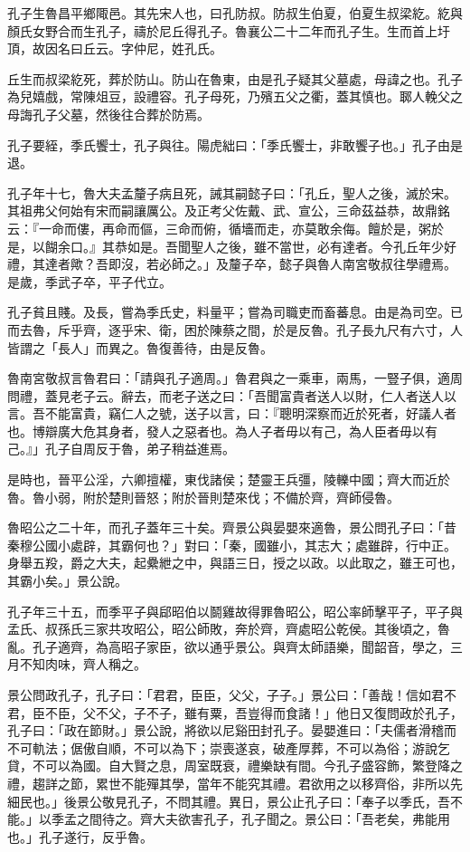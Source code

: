 
\begin{pinyinscope}
孔子生魯昌平鄉陬邑。其先宋人也，曰孔防叔。防叔生伯夏，伯夏生叔梁紇。紇與顏氏女野合而生孔子，禱於尼丘得孔子。魯襄公二十二年而孔子生。生而首上圩頂，故因名曰丘云。字仲尼，姓孔氏。

丘生而叔梁紇死，葬於防山。防山在魯東，由是孔子疑其父墓處，母諱之也。孔子為兒嬉戲，常陳俎豆，設禮容。孔子母死，乃殯五父之衢，蓋其慎也。郰人輓父之母誨孔子父墓，然後往合葬於防焉。

孔子要絰，季氏饗士，孔子與往。陽虎絀曰：「季氏饗士，非敢饗子也。」孔子由是退。

孔子年十七，魯大夫孟釐子病且死，誡其嗣懿子曰：「孔丘，聖人之後，滅於宋。其祖弗父何始有宋而嗣讓厲公。及正考父佐戴、武、宣公，三命茲益恭，故鼎銘云：『一命而僂，再命而傴，三命而俯，循墻而走，亦莫敢余侮。饘於是，粥於是，以餬余口。』其恭如是。吾聞聖人之後，雖不當世，必有達者。今孔丘年少好禮，其達者歟？吾即沒，若必師之。」及釐子卒，懿子與魯人南宮敬叔往學禮焉。是歲，季武子卒，平子代立。

孔子貧且賤。及長，嘗為季氏史，料量平；嘗為司職吏而畜蕃息。由是為司空。已而去魯，斥乎齊，逐乎宋、衛，困於陳蔡之間，於是反魯。孔子長九尺有六寸，人皆謂之「長人」而異之。魯復善待，由是反魯。

魯南宮敬叔言魯君曰：「請與孔子適周。」魯君與之一乘車，兩馬，一豎子俱，適周問禮，蓋見老子云。辭去，而老子送之曰：「吾聞富貴者送人以財，仁人者送人以言。吾不能富貴，竊仁人之號，送子以言，曰：『聰明深察而近於死者，好議人者也。博辯廣大危其身者，發人之惡者也。為人子者毋以有己，為人臣者毋以有己。』」孔子自周反于魯，弟子稍益進焉。

是時也，晉平公淫，六卿擅權，東伐諸侯；楚靈王兵彊，陵轢中國；齊大而近於魯。魯小弱，附於楚則晉怒；附於晉則楚來伐；不備於齊，齊師侵魯。

魯昭公之二十年，而孔子蓋年三十矣。齊景公與晏嬰來適魯，景公問孔子曰：「昔秦穆公國小處辟，其霸何也？」對曰：「秦，國雖小，其志大；處雖辟，行中正。身舉五羖，爵之大夫，起纍紲之中，與語三日，授之以政。以此取之，雖王可也，其霸小矣。」景公說。

孔子年三十五，而季平子與郈昭伯以鬬雞故得罪魯昭公，昭公率師擊平子，平子與孟氏、叔孫氏三家共攻昭公，昭公師敗，奔於齊，齊處昭公乾侯。其後頃之，魯亂。孔子適齊，為高昭子家臣，欲以通乎景公。與齊太師語樂，聞韶音，學之，三月不知肉味，齊人稱之。

景公問政孔子，孔子曰：「君君，臣臣，父父，子子。」景公曰：「善哉！信如君不君，臣不臣，父不父，子不子，雖有粟，吾豈得而食諸！」他日又復問政於孔子，孔子曰：「政在節財。」景公說，將欲以尼谿田封孔子。晏嬰進曰：「夫儒者滑稽而不可軌法；倨傲自順，不可以為下；崇喪遂哀，破產厚葬，不可以為俗；游說乞貸，不可以為國。自大賢之息，周室既衰，禮樂缺有間。今孔子盛容飾，繁登降之禮，趨詳之節，累世不能殫其學，當年不能究其禮。君欲用之以移齊俗，非所以先細民也。」後景公敬見孔子，不問其禮。異日，景公止孔子曰：「奉子以季氏，吾不能。」以季孟之間待之。齊大夫欲害孔子，孔子聞之。景公曰：「吾老矣，弗能用也。」孔子遂行，反乎魯。


\end{pinyinscope}
